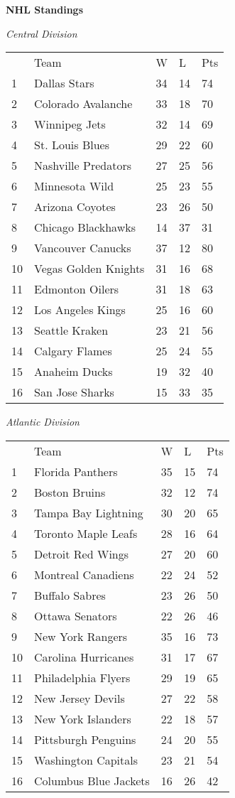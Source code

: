 \textbf{NHL Standings}

\textit{Central Division}
\begin{tabular}{lllll}
 & Team & W & L & Pts \\
1 & Dallas Stars & 34 & 14 & 74 \\
2 & Colorado Avalanche & 33 & 18 & 70 \\
3 & Winnipeg Jets & 32 & 14 & 69 \\
4 & St. Louis Blues & 29 & 22 & 60 \\
5 & Nashville Predators & 27 & 25 & 56 \\
6 & Minnesota Wild & 25 & 23 & 55 \\
7 & Arizona Coyotes & 23 & 26 & 50 \\
8 & Chicago Blackhawks & 14 & 37 & 31 \\
9 & Vancouver Canucks & 37 & 12 & 80 \\
10 & Vegas Golden Knights & 31 & 16 & 68 \\
11 & Edmonton Oilers & 31 & 18 & 63 \\
12 & Los Angeles Kings & 25 & 16 & 60 \\
13 & Seattle Kraken & 23 & 21 & 56 \\
14 & Calgary Flames & 25 & 24 & 55 \\
15 & Anaheim Ducks & 19 & 32 & 40 \\
16 & San Jose Sharks & 15 & 33 & 35 \\
\end{tabular}


\textit{Atlantic Division}
\begin{tabular}{lllll}
 & Team & W & L & Pts \\
1 & Florida Panthers & 35 & 15 & 74 \\
2 & Boston Bruins & 32 & 12 & 74 \\
3 & Tampa Bay Lightning & 30 & 20 & 65 \\
4 & Toronto Maple Leafs & 28 & 16 & 64 \\
5 & Detroit Red Wings & 27 & 20 & 60 \\
6 & Montreal Canadiens & 22 & 24 & 52 \\
7 & Buffalo Sabres & 23 & 26 & 50 \\
8 & Ottawa Senators & 22 & 26 & 46 \\
9 & New York Rangers & 35 & 16 & 73 \\
10 & Carolina Hurricanes & 31 & 17 & 67 \\
11 & Philadelphia Flyers & 29 & 19 & 65 \\
12 & New Jersey Devils & 27 & 22 & 58 \\
13 & New York Islanders & 22 & 18 & 57 \\
14 & Pittsburgh Penguins & 24 & 20 & 55 \\
15 & Washington Capitals & 23 & 21 & 54 \\
16 & Columbus Blue Jackets & 16 & 26 & 42 \\
\end{tabular}


